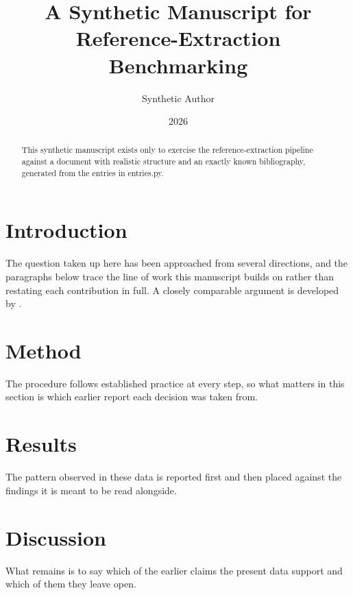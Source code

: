 \documentclass{article}
\title{A Synthetic Manuscript for Reference-Extraction Benchmarking}
\author{Synthetic Author}
\date{2026}
\begin{document}
\maketitle

\begin{abstract}
This synthetic manuscript exists only to exercise the reference-extraction pipeline against a document with realistic structure and an exactly known bibliography, generated from the entries in entries.py.
\end{abstract}

\section{Introduction}
The question taken up here has been approached from several directions, and the paragraphs below trace the line of work this manuscript builds on rather than restating each contribution in full. A closely comparable argument is developed by \textcite{higgs1964broken}.

\section{Method}
The procedure follows established practice at every step, so what matters in this section is which earlier report each decision was taken from.

\section{Results}
The pattern observed in these data is reported first and then placed against the findings it is meant to be read alongside.

\section{Discussion}
What remains is to say which of the earlier claims the present data support and which of them they leave open.

\printbibliography
\end{document}
